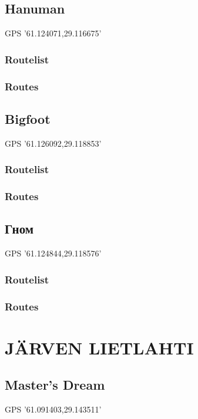 \documentclass[8pt, a5paper,notitlepage,openany]{report}
\begin{document}
\clearpage
 \section{Hanuman}
 GPS '61.124071,29.116675'
\subsection{Routelist}

\newpage
\subsection{Routes}


\clearpage
 \section{Bigfoot}
 GPS '61.126092,29.118853'
\subsection{Routelist}

\newpage
\subsection{Routes}


\clearpage
 \section{Гном}
 GPS '61.124844,29.118576'
\subsection{Routelist}

\newpage
\subsection{Routes}



 \chapter{ JÄRVEN LIETLAHTI}
 
  \section{Master's Dream}
 GPS '61.091403,29.143511'
\end{document}
